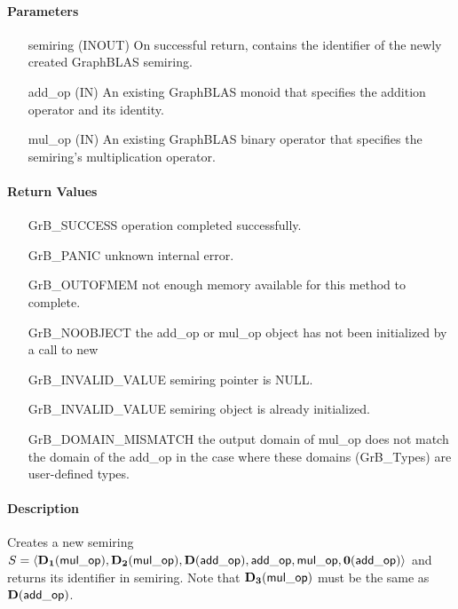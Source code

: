 \paragraph{Parameters}

\begin{itemize}[leftmargin=1.1in]
    \item[{\sf semiring}] ({\sf INOUT}) On successful return, contains the 
    identifier of the newly created GraphBLAS semiring.
    \item[{\sf add\_op}]  ({\sf IN}) An existing GraphBLAS monoid that specifies the addition operator and its identity.
    \item[{\sf mul\_op}]  ({\sf IN}) An existing GraphBLAS binary operator that specifies the semiring's multiplication operator.
\end{itemize}


\paragraph{Return Values}

\begin{itemize}[leftmargin=2.1in]
\item[{\sf GrB\_SUCCESS}]           operation completed successfully.
\item[{\sf GrB\_PANIC}]             unknown internal error.
\item[{\sf GrB\_OUTOFMEM}]          not enough memory available for this method to complete.
\item[{\sf GrB\_NOOBJECT}]          the {\sf add\_op} or {\sf mul\_op} object has
                                    not been initialized by a call to {\sf new}
\item[{\sf GrB\_INVALID\_VALUE}]    {\sf semiring} pointer is {\sf NULL}.
\item[{\sf GrB\_INVALID\_VALUE}]    {\sf semiring} object is already initialized.
\item[{\sf GrB\_DOMAIN\_MISMATCH}]  the output domain of {\sf mul\_op} does not
                                    match the domain of the {\sf add\_op} in the
                                    case where these domains ({\sf GrB\_Type}s)
                                    are user-defined types.
\end{itemize}

\paragraph{Description}

Creates a new semiring $S = \langle \bold{D_1}({\sf mul\_op}), \bold{D_2}({\sf mul\_op}), 
\bold{D}({\sf add\_op}), {\sf add\_op}, {\sf mul\_op}, \bold{0}({\sf add\_op})\rangle$ and 
returns its identifier in {\sf semiring}.  Note that $\bold{D_3}({\sf mul\_op})$ must be
the same as $\bold{D}({\sf add\_op})$.

